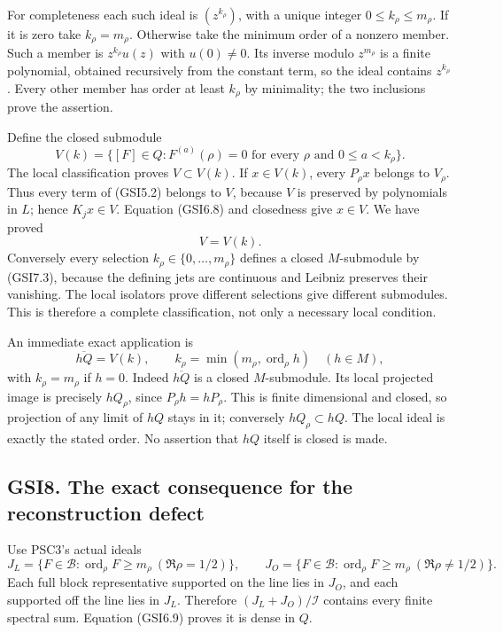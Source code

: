 For completeness each such ideal is \((z^{k_\rho})\), with a unique
integer \(0\le k_\rho\le m_\rho\). If it is zero take \(k_\rho=m_\rho\).
Otherwise take the minimum order of a nonzero member. Such a member is
\(z^{k_\rho}u(z)\) with \(u(0)\ne0\). Its inverse modulo \(z^{m_\rho}\)
is a finite polynomial, obtained recursively from the constant term, so
the ideal contains \(z^{k_\rho}\). Every other member has order at least
\(k_\rho\) by minimality; the two inclusions prove the assertion.

Define the closed submodule \[
V(k)=\{[F]\in Q:F^{(a)}(\rho)=0
\text{ for every }\rho\text{ and }0\le a<k_\rho\}.
\tag{GSI7.3}
\] The local classification proves \(V\subset V(k)\). If \(x\in V(k)\),
every \(P_\rho x\) belongs to \(V_\rho\). Thus every term of (GSI5.2)
belongs to \(V\), because \(V\) is preserved by polynomials in \(L\);
hence \(K_jx\in V\). Equation (GSI6.8) and closedness give \(x\in V\).
We have proved \[
\boxed{V=V(k).}
\tag{GSI7.4}
\] Conversely every selection \(k_\rho\in\{0,\ldots,m_\rho\}\) defines a
closed \(M\)-submodule by (GSI7.3), because the defining jets are
continuous and Leibniz preserves their vanishing. The local isolators
prove different selections give different submodules. This is therefore
a complete classification, not only a necessary local condition.

An immediate exact application is \[
\overline{hQ}=V(k),\qquad
k_\rho=\min(m_\rho,\operatorname{ord}_\rho h)
\quad(h\in M),
\tag{GSI7.5}
\] with \(k_\rho=m_\rho\) if \(h=0\). Indeed \(\overline{hQ}\) is a
closed \(M\)-submodule. Its local projected image is precisely
\(hQ_\rho\), since \(P_\rho h=hP_\rho\). This is finite dimensional and
closed, so projection of any limit of \(hQ\) stays in it; conversely
\(hQ_\rho\subset hQ\). The local ideal is exactly the stated order. No
assertion that \(hQ\) itself is closed is made.

\subsection{GSI8. The exact consequence for the reconstruction
defect}\label{gsi8.-the-exact-consequence-for-the-reconstruction-defect}

Use PSC3's actual ideals \[
J_L=\{F\in\mathcal B:\operatorname{ord}_\rho F\ge m_\rho
\ (\Re\rho=1/2)\},\qquad
J_O=\{F\in\mathcal B:\operatorname{ord}_\rho F\ge m_\rho
\ (\Re\rho\ne1/2)\}.
\tag{GSI8.1}
\] Each full block representative supported on the line lies in \(J_O\),
and each supported off the line lies in \(J_L\). Therefore
\((J_L+J_O)/\mathcal I\) contains every finite spectral sum. Equation
(GSI6.9) proves it is dense in \(Q\).

